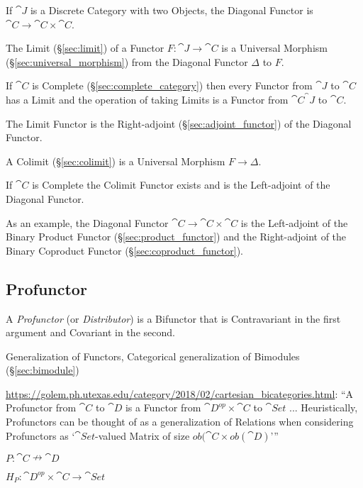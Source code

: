 If $\cat{J}$ is a Discrete Category with two Objects, the Diagonal
Functor is $\cat{C} \rightarrow \cat{C} \times \cat{C}$.

The Limit (\S\ref{sec:limit}) of a Functor $F : \cat{J} \rightarrow
\cat{C}$ is a Universal Morphism (\S\ref{sec:universal_morphism})
from the Diagonal Functor $\Delta$ to $F$.

If $\cat{C}$ is Complete (\S\ref{sec:complete_category}) then every
Functor from $\cat{J}$ to $\cat{C}$ has a Limit and the
operation of taking Limits is a Functor from $\cat{C}^\cat{J}$
to $\cat{C}$.

The Limit Functor is the Right-adjoint (\S\ref{sec:adjoint_functor})
of the Diagonal Functor.

A Colimit (\S\ref{sec:colimit}) is a Universal Morphism $F \rightarrow
\Delta$.

If $\cat{C}$ is Complete the Colimit Functor exists and is the
Left-adjoint of the Diagonal Functor.

As an example, the Diagonal Functor $\cat{C} \rightarrow \cat{C}
\times \cat{C}$ is the Left-adjoint of the Binary Product Functor
(\S\ref{sec:product_functor}) and the Right-adjoint of the Binary
Coproduct Functor (\S\ref{sec:coproduct_functor}).



\subsection{Profunctor}\label{sec:profunctor}

A \emph{Profunctor} (or \emph{Distributor}) is a Bifunctor that is
Contravariant in the first argument and Covariant in the second.

Generalization of Functors, Categorical generalization of Bimodules
(\S\ref{sec:bimodule})

\url{https://golem.ph.utexas.edu/category/2018/02/cartesian_bicategories.html}:
``A Profunctor from $\cat{C}$ to $\cat{D}$ is a Functor from $\cat{D}^{op}
\times \cat{C}$ to $\cat{Set}$ ... Heuristically, Profunctors can be thought of
as a generalization of Relations when considering Profunctors as
`$\cat{Set}$-valued Matrix of size $ob(\cat{C} \times ob(\cat{D})$'''

$P : \cat{C} \nrightarrow \cat{D}$

$H_P : \cat{D}^{op} \times \cat{C} \rightarrow \cat{Set}$


